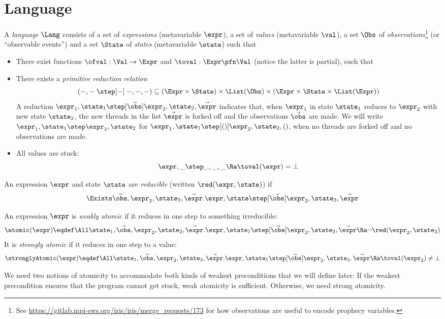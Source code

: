 \section{Language}
\label{sec:language}

A \emph{language} $\Lang$ consists of a set \Expr{} of \emph{expressions} (metavariable $\expr$), a set \Val{} of \emph{values} (metavariable $\val$), a set $\Obs$ of \emph{observations}\footnote{See \url{https://gitlab.mpi-sws.org/iris/iris/merge_requests/173} for how observations are useful to encode prophecy variables.} (or ``observable events'') and a set $\State$ of \emph{states} (metavariable $\state$) such that
\begin{itemize}[itemsep=0pt]
\item There exist functions $\ofval : \Val \to \Expr$ and $\toval : \Expr \pfn \Val$ (notice the latter is partial), such that
\item There exists a \emph{primitive reduction relation} \[(-,- \;\step[-]\; -,-,-) \subseteq (\Expr \times \State) \times \List(\Obs) \times (\Expr \times \State \times \List(\Expr))\]
  A reduction $\expr_1, \state_1 \step[\vec\obs] \expr_2, \state_2, \vec\expr$ indicates that, when $\expr_1$ in state $\state_1$ reduces to $\expr_2$ with new state $\state_2$, the new threads in the list $\vec\expr$ is forked off and the observations $\vec\obs$ are made.
  We will write $\expr_1, \state_1 \step \expr_2, \state_2$ for $\expr_1, \state_1 \step[()] \expr_2, \state_2, ()$, \ie when no threads are forked off and no observations are made. \\
\item All values are stuck:
\[ \expr, \_ \step  \_, \_, \_ \Ra \toval(\expr) = \bot \]
\end{itemize}

\begin{defn}
  An expression $\expr$ and state $\state$ are \emph{reducible} (written $\red(\expr, \state)$) if
  \[ \Exists \vec\obs, \expr_2, \state_2, \vec\expr. \expr,\state \step[\vec\obs] \expr_2,\state_2,\vec\expr \]
\end{defn}

\begin{defn}
  An expression $\expr$ is \emph{weakly atomic} if it reduces in one step to something irreducible:
  \[ \atomic(\expr) \eqdef \All\state_1, \vec\obs, \expr_2, \state_2, \vec\expr. \expr, \state_1 \step[\vec\obs] \expr_2, \state_2, \vec\expr \Ra \lnot \red(\expr_2, \state_2) \]
  It is \emph{strongly atomic} if it reduces in one step to a value:
  \[ \stronglyAtomic(\expr) \eqdef \All\state_1, \vec\obs, \expr_2, \state_2, \vec\expr. \expr, \state_1 \step[\vec\obs] \expr_2, \state_2, \vec\expr \Ra \toval(\expr_2) \neq \bot \]
\end{defn}
We need two notions of atomicity to accommodate both kinds of weakest preconditions that we will define later:
If the weakest precondition ensures that the program cannot get stuck, weak atomicity is sufficient.
Otherwise, we need strong atomicity.

